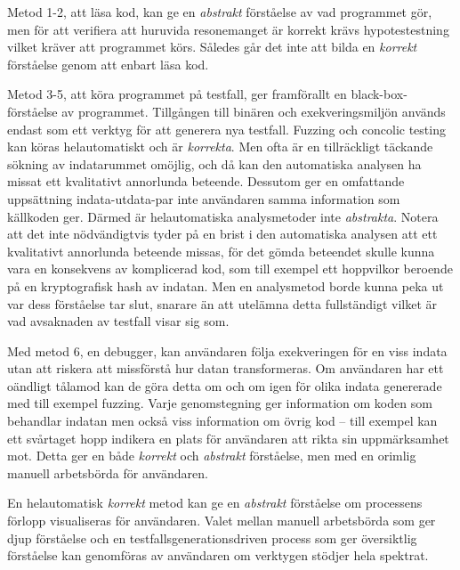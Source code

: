 Metod 1-2, att läsa kod, kan ge en \textit{abstrakt} förståelse av vad programmet gör, men för
att verifiera att huruvida resonemanget är korrekt krävs hypotestestning vilket
kräver att programmet körs. Således går det inte att bilda en \textit{korrekt} förståelse genom 
att enbart läsa kod.

Metod 3-5, att köra programmet på testfall, ger framförallt en black-box-förståelse av
programmet. Tillgången till binären och exekveringsmiljön används endast som ett verktyg
för att generera nya testfall. Fuzzing och concolic testing kan köras helautomatiskt och är
\textit{korrekta}. Men ofta är en tillräckligt täckande sökning av indatarummet omöjlig, och då kan
den automatiska analysen ha missat ett kvalitativt annorlunda beteende. Dessutom ger en omfattande
uppsättning indata-utdata-par inte användaren samma information som källkoden ger. Därmed är
helautomatiska analysmetoder inte \textit{abstrakta}. Notera att det inte nödvändigtvis tyder på en
brist i den automatiska analysen att ett kvalitativt annorlunda beteende missas, för det gömda
beteendet skulle kunna vara en konsekvens av komplicerad kod, som till exempel ett hoppvilkor
beroende på en kryptografisk hash av indatan. Men en analysmetod borde kunna peka ut var dess
förståelse tar slut, snarare än att utelämna detta fullständigt vilket är vad avsaknaden av testfall
visar sig som.

Med metod 6, en debugger, kan användaren följa exekveringen för en viss indata utan att riskera
att missförstå hur datan transformeras. Om användaren har ett oändligt tålamod kan de göra detta om
och om igen för olika indata genererade med till exempel fuzzing. Varje genomstegning ger
information om koden som behandlar indatan men också viss information om övrig kod -- till exempel
kan ett svårtaget hopp indikera en plats för användaren att rikta sin uppmärksamhet mot. Detta ger
en både \textit{korrekt} och \textit{abstrakt} förståelse, men med en orimlig manuell arbetsbörda
för användaren.

En helautomatisk \textit{korrekt} metod kan ge en \textit{abstrakt} förståelse om processens förlopp
visualiseras för användaren. Valet mellan manuell arbetsbörda som ger djup förståelse och en
testfallsgenerationsdriven process som ger översiktlig förståelse kan genomföras av användaren om
verktygen stödjer hela spektrat.
